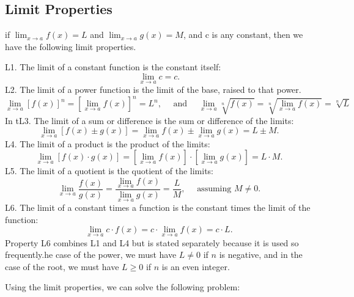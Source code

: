 \documentclass{report}
\begin{document}
\subsection*{Limit Properties}
\bigbreak \noindent
if $\displaystyle\lim_{x\to a}f(x) = L$ and $\displaystyle\lim_{x\to a }g(x) = M$, and c is any constant, then we have the following limit properties.
\bigbreak \noindent
\begin{mdframed}
L1. The limit of a constant function is the constant itself:
$$
\lim _{x \rightarrow a} c=c .
$$
L2. The limit of a power function is the limit of the base, raised to that power.
$$
\lim _{x \rightarrow a}[f(x)]^n=\left[\lim _{x \rightarrow a} f(x)\right]^n=L^n, \quad \text { and } \quad \lim _{x \rightarrow a} \sqrt[n]{f(x)}=\sqrt[n]{\lim _{x \rightarrow a} f(x)}=\sqrt[n]{L}
$$
In tL3. The limit of a sum or difference is the sum or difference of the limits:
$$
\lim _{x \rightarrow a}[f(x) \pm g(x)]=\lim _{x \rightarrow a} f(x) \pm \lim _{x \rightarrow a} g(x)=L \pm M .
$$
L4. The limit of a product is the product of the limits:
$$
\lim _{x \rightarrow a}[f(x) \cdot g(x)]=\left[\lim _{x \rightarrow a} f(x)\right] \cdot\left[\lim _{x \rightarrow a} g(x)\right]=L \cdot M .
$$
L5. The limit of a quotient is the quotient of the limits:
$$
\lim _{x \rightarrow a} \frac{f(x)}{g(x)}=\frac{\lim _{x \rightarrow a} f(x)}{\lim _{x \rightarrow a} g(x)}=\frac{L}{M}, \quad \text { assuming } M \neq 0 .
$$
L6. The limit of a constant times a function is the constant times the limit of the function:
$$
\lim _{x \rightarrow a} c \cdot f(x)=c \cdot \lim _{x \rightarrow a} f(x)=c \cdot L .
$$
Property L6 combines L1 and L4 but is stated separately because it is used so frequently.he case of the power, we must have $L \neq 0$ if $n$ is negative, and in the case of the root, we must have $L \geq 0$ if $n$ is an even integer.
\end{mdframed}
\bigbreak \bigbreak \noindent
Using the limit properties, we can solve the following problem:
\end{document}
